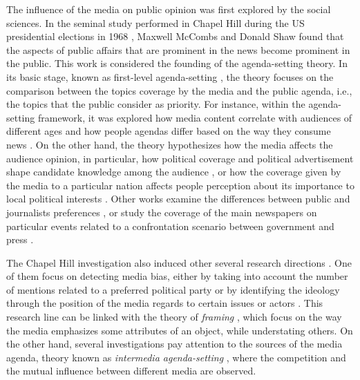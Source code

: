 \documentclass{bmcart}
\begin{document}
\par The influence of the media on public opinion was first explored by the social sciences. 
In the seminal study performed in Chapel Hill during the US presidential elections in 1968 \cite{mccombs1972agenda}, Maxwell McCombs and Donald Shaw found that the aspects of public affairs that are prominent in the news become prominent in the public. This work is considered the founding of the agenda-setting theory.
In its basic stage, known as first-level agenda-setting \cite{mccombs2005look}, the theory focuses on the comparison between the topics coverage by the media and the public agenda, i.e., the topics that the public consider as priority.
For instance, within the agenda-setting framework, it was explored how media content correlate with audiences of different ages \cite{coleman2007young} and how people agendas differ based on the way they consume news \cite{althaus2002agenda}.
On the other hand, the theory hypothesizes how the media affects the audience opinion, in particular, how political coverage and political advertisement shape candidate knowledge among the audience \cite{brians1996campaign, gerber2009does}, or how the coverage given by the media to a particular nation affects people perception about its importance to local political interests \cite{wanta2004agenda}.
Other works examine the differences between public and journalists preferences \cite{mitchelstein2016brecha}, or study the coverage of the main newspapers on particular events related to a confrontation scenario between government and press \cite{zunino2010cobertura, koziner2013cobertura}.


\par The Chapel Hill investigation also induced other several research directions \cite{mccombs2005look}.
One of them focus on detecting media bias, either by taking into account the number of mentions related  to a preferred political party \cite{lazaridou2016identifying, baumgartner2015all} or by identifying the ideology through the position of the media regards to certain issues or actors \cite{elejalde2018nature, sagarzazu2017hugo}. 
This research line can be linked with the theory of \textit{framing} \cite{guggenheim2015dynamics, tsur2015frame}, which focus on the way the media emphasizes some attributes of an object, while understating others. 
On the other hand, several investigations pay attention to the sources of the media agenda, theory known as \textit{intermedia agenda-setting} \cite{vargo2017networks, harder2017intermedia, guo2017global}, where the competition and the mutual influence between different media are observed.
\end{document}
